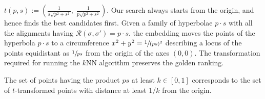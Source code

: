 $t(p,s):=\left(\frac{1}{s\sqrt{p^2+s^2}},\; \frac{1}{p\sqrt{p^2+s^2}}\right)$.
Our search always starts from the origin, and hence finds the best candidates first.
%
	{Given a family of hyperbolae $p\cdot s$ with all the alignments having
		$\mathcal{R}(\sigma,\sigma')=p\cdot s$.
%		
	the embedding moves the points of the hyperbola $p\cdot s$ to a circumference $x^2+y^2=\sfrac{1}{(ps)^2}$ describing a locus of the points equidistant as $\sfrac{1}{ps}$ from the origin of the axes $(0,0)$.}
%
The transformation required for running the $k$NN algorithm preserves the golden ranking.

\begin{lemma}
	\label{lem:transfspace}
	The set of points having the product $ps$ at least $k\in[0,1]$ corresponds to the set of $t$-transformed points with distance
	at least $1/k$ from the origin.
\end{lemma}

